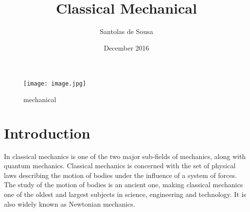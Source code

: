 \documentclass[12pt,a4paper]{article}
\title{Classical Mechanical}
\author{Santolas de Sousa}
\date{December 2016}
\begin{document}
\begin{titlepage}
  \maketitle
  \begin{figure}[!htb]
    \centering
    \texttt{[image: image.jpg]}
    \caption{mechanical}
    \label{mechanical}
  \end{figure}

\end{titlepage}

\maketitle
  
\section{Introduction}

In classical mechanics is one of the two major sub-fields of mechanics, along with quantum mechanics. Classical mechanics is concerned with the set of physical laws describing the motion of bodies under the influence of a system of forces. The study of the motion of bodies is an ancient one, making classical mechanics one of the oldest and largest subjects in science, engineering and technology. It is also widely known as Newtonian mechanics.
\end{document}
